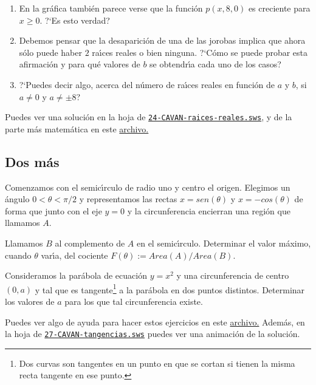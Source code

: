 \begin{enumerate}
\item En la gr\'afica tambi\'en parece verse que la funci\'on $p(x,8,0)$ es
creciente para $x\ge 0$. ?`Es esto verdad?
 
 \item Debemos pensar que la desaparici\'on de una de las jorobas implica que
ahora s\'olo puede haber $2$ ra\'{\i}ces reales o bien ninguna. ?`C\'omo se
puede probar esta afirmaci\'on y para qu\'e valores de $b$ se obtendr\'{\i}a 
cada uno de los casos?

\item ?`Puedes decir algo,  acerca del n\'umero de ra\'{\i}ces reales en
funci\'on de $a$ y $b$, si $a\ne
0$ y $a\ne \pm 8$?
 
\end{enumerate}

Puedes ver una soluci\'on en la hoja de {\sage}
\href{http://sage.mat.uam.es:8888/home/pub/23/}{\tt 24-CAVAN-raices-reales.sws},
y de la parte m\'as matem\'atica en este
\href{http://150.244.21.37/PDFs/CAVAN/un_ejercicio_calculo.pdf}{archivo.}

\subsection{Dos m\'as}

\begin{ejer}
Comenzamos con el semic\'{\i}rculo de radio uno y centro el
origen. Elegimos un \'angulo $0<\theta<\pi/2$ y representamos las rectas
$x=sen(\theta)$ y $x=-cos(\theta)$  de forma que junto con el eje $y=0$ y la
circunferencia encierran una regi\'on que llamamos $A$.

Llamamos $B$ al complemento de $A$ en el semic\'{\i}rculo. {\sc Determinar} el
valor m\'aximo, cuando $\theta$ var\'{\i}a, 
 del cociente $F(\theta):=Area(A)/Area(B)$.
 
\end{ejer}

\begin{ejer}
 Consideramos la par\'abola de ecuaci\'on $y=x^2$ y una
circunferencia de centro $(0,a)$ y tal que es tangente\footnote{Dos curvas son
tangentes en un punto en que se cortan si tienen la misma recta tangente en ese
punto.} a la par\'abola en dos puntos distintos. {\sc Determinar} los valores de
$a$ para los que tal circunferencia existe.
\end{ejer}

Puedes ver algo de ayuda para hacer estos ejercicios en este
\href{http://150.244.21.37/PDFs/CAVAN/dos_ejercicios_calculo.pdf}{archivo.} Adem\'as, en la hoja
de {\sage}
\href{http://sage.mat.uam.es:8888/home/pub/3/}{\tt 27-CAVAN-tangencias.sws}
puedes ver una animaci\'on de la soluci\'on.



